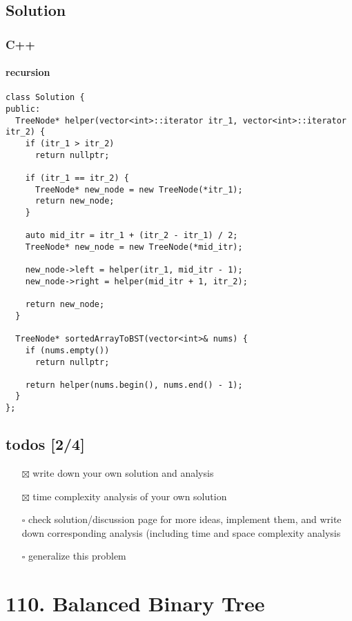 \documentclass[12pt]{article}
\begin{document}
\subsection{Solution}
\label{sec:orgd0ce4ea}
\subsubsection{C++}
\label{sec:orgbeee7d9}
\paragraph{recursion}
\label{sec:orgc9e0675}
\begin{verbatim}
class Solution {
public:
  TreeNode* helper(vector<int>::iterator itr_1, vector<int>::iterator itr_2) {
    if (itr_1 > itr_2)
      return nullptr;

    if (itr_1 == itr_2) {
      TreeNode* new_node = new TreeNode(*itr_1);
      return new_node;
    }

    auto mid_itr = itr_1 + (itr_2 - itr_1) / 2;
    TreeNode* new_node = new TreeNode(*mid_itr);

    new_node->left = helper(itr_1, mid_itr - 1);
    new_node->right = helper(mid_itr + 1, itr_2);

    return new_node;
  }

  TreeNode* sortedArrayToBST(vector<int>& nums) {
    if (nums.empty())
      return nullptr;

    return helper(nums.begin(), nums.end() - 1);
  }
};
\end{verbatim}
\subsection{todos [2/4]}
\label{sec:org6cb6ab0}
\begin{itemize}
\item[{$\boxtimes$}] write down your own solution and analysis
\item[{$\boxtimes$}] time complexity analysis of your own solution
\item[{$\square$}] check solution/discussion page for more ideas, implement them, and write down corresponding analysis (including time and space complexity analysis
\item[{$\square$}] generalize this problem
\end{itemize}
\section{110. Balanced Binary Tree}
\label{sec:org72dd2e0}
\end{document}
